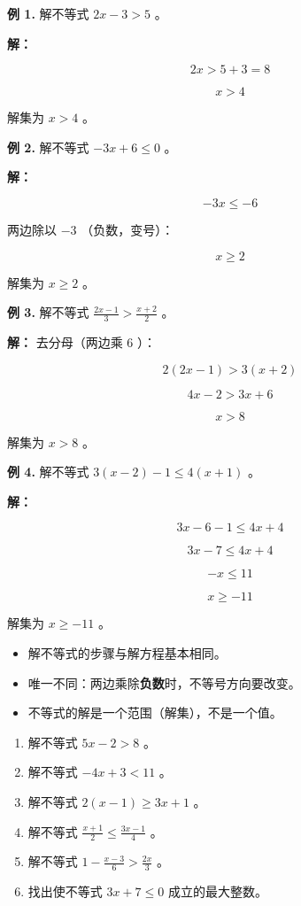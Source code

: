 \begin{workedexamples}


\textbf{例 1.} 解不等式 $2x - 3 > 5$ 。

\textbf{解：}

\[
2x > 5 + 3 = 8
\]


\[
x > 4
\]


解集为 $x > 4$ 。

\textbf{例 2.} 解不等式 $-3x + 6 \leq 0$ 。

\textbf{解：}

\[
-3x \leq -6
\]


两边除以 $-3$ （负数，变号）：

\[
x \geq 2
\]


解集为 $x \geq 2$ 。

\textbf{例 3.} 解不等式 $\frac{2x - 1}{3} > \frac{x + 2}{2}$ 。

\textbf{解：} 去分母（两边乘 $6$ ）：

\[
2(2x - 1) > 3(x + 2)
\]


\[
4x - 2 > 3x + 6
\]


\[
x > 8
\]


解集为 $x > 8$ 。

\textbf{例 4.} 解不等式 $3(x - 2) - 1 \leq 4(x + 1)$ 。

\textbf{解：}

\[
3x - 6 - 1 \leq 4x + 4
\]


\[
3x - 7 \leq 4x + 4
\]


\[
-x \leq 11
\]


\[
x \geq -11
\]


解集为 $x \geq -11$ 。

\end{workedexamples}

\begin{keytakeaway}


\begin{itemize}
  \item 解不等式的步骤与解方程基本相同。
  \item 唯一不同：两边乘除\textbf{负数}时，不等号方向要改变。
  \item 不等式的解是一个范围（解集），不是一个值。
\end{itemize}


\end{keytakeaway}

\begin{practice}


\begin{enumerate}
  \item 解不等式 $5x - 2 > 8$ 。
  \item 解不等式 $-4x + 3 < 11$ 。
  \item 解不等式 $2(x - 1) \geq 3x + 1$ 。
  \item 解不等式 $\frac{x + 1}{2} \leq \frac{3x - 1}{4}$ 。
  \item 解不等式 $1 - \frac{x - 3}{6} > \frac{2x}{3}$ 。
  \item 找出使不等式 $3x + 7 \leq 0$ 成立的最大整数。
\end{enumerate}


\end{practice}

